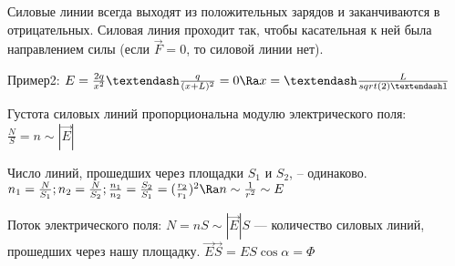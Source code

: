 Силовые линии всегда выходят из положительных зарядов и заканчиваются в отрицательных. Силовая линия проходит так, чтобы касательная к ней была направлением силы (если $\overrightarrow{F} = 0$, то силовой линии нет).

Пример2:  $E = \frac{2q}{x^2} – \frac{q}{(x + L)^2} = 0 \Ra x = – \frac{L}{sqrt(2) – 1}$



Густота силовых линий пропорциональна модулю электрического поля: $\frac{N}{S} = n \sim |\overrightarrow{E}|$


Число линий, прошедших через площадки $S_1$ и $S_2$, – одинаково. $n_1 = \frac{N}{S_1}; n_2 = \frac{N}{S_2}; \frac{n_1}{n_2} = \frac{S_2}{S_1} = (\frac{r_2}{r_1})^2 \Ra n \sim \frac{1}{r^2} \sim E$

Поток электрического поля: $N = nS \sim |\overrightarrow{E}|S$ — количество силовых линий, прошедших через нашу площадку. $\overrightarrow{E}\overrightarrow{S} = ES\cos{\alpha} = \Phi$

